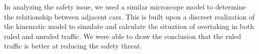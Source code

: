 In analyzing the safety issue, we used a similar microscope model to determine the relationship between adjacent cars. This is built upon a discreet realization of the kinematic model to simulate and calculate the situation of overtaking in both ruled and unruled traffic. We were able to draw the conclusion that the ruled traffic is better at reducing the safety threat.